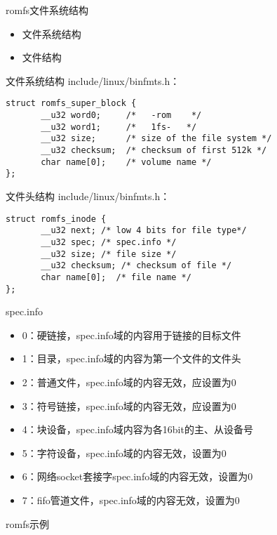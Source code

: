\begin{frame}{romfs文件系统结构}
\begin{itemize}
\item 文件系统结构
\item 文件结构
\end{itemize}
\end{frame}

\begin{frame}[containsverbatim]{文件系统结构}
include/linux/binfmts.h：
\begin{lstlisting}
struct romfs_super_block {
       __u32 word0;     /*   -rom    */
       __u32 word1;     /*   1fs-   */
       __u32 size;      /* size of the file system */
       __u32 checksum;  /* checksum of first 512k */
       char name[0];    /* volume name */
};
\end{lstlisting}
\end{frame}

\begin{frame}[containsverbatim]{文件头结构}
include/linux/binfmts.h：
\begin{lstlisting}
struct romfs_inode {
       __u32 next; /* low 4 bits for file type*/
       __u32 spec; /* spec.info */
       __u32 size; /* file size */
       __u32 checksum; /* checksum of file */
       char name[0];  /* file name */
};

\end{lstlisting}
\end{frame}

\begin{frame}{spec.info}
\begin{itemize}
\item 0：硬链接，spec.info域的内容用于链接的目标文件
\item 1：目录，spec.info域的内容为第一个文件的文件头
\item 2：普通文件，spec.info域的内容无效，应设置为0
\item 3：符号链接，spec.info域的内容无效，应设置为0
\item 4：块设备，spec.info域内容为各16bit的主、从设备号 
\item 5：字符设备，spec.info域的内容无效，设置为0
\item 6：网络socket套接字spec.info域的内容无效，设置为0
\item 7：fifo管道文件，spec.info域的内容无效，设置为0
\end{itemize}
\end{frame}

\begin{frame}{romfs示例}
\begin{center}\end{center}
\end{frame}

